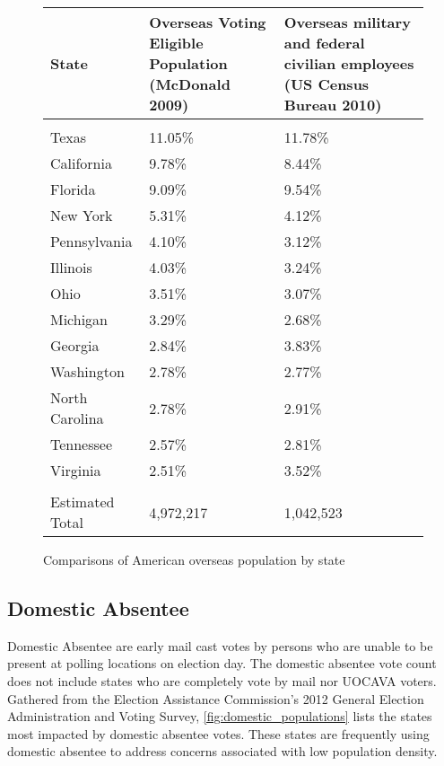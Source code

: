 \begin{figure}
\begin{center}
\begin{tabular}{l p{} p{}} %
{\bf State} & {\bf Overseas Voting Eligible \newline Population} \newline(McDonald 2009) & {\bf Overseas military and federal \newline civilian employees} \newline(US Census Bureau 2010)\\\hline\\
Texas & 11.05\% & 11.78\%\\
California & 9.78\% & 8.44\% \\
Florida & 9.09\% & 9.54\% \\
New York & 5.31\% & 4.12\% \\
Pennsylvania & 4.10\% & 3.12\% \\
Illinois & 4.03\% & 3.24\% \\
Ohio & 3.51\% & 3.07\% \\
Michigan & 3.29\% & 2.68\% \\
Georgia & 2.84\% & 3.83\% \\
Washington & 2.78\% & 2.77\% \\
North Carolina & 2.78\% & 2.91\% \\
Tennessee & 2.57\% & 2.81\% \\
Virginia & 2.51\% & 3.52\% \\\hline\\
Estimated Total & 4,972,217 & 1,042,523
\end{tabular}
\end{center}
\caption{Comparisons of American overseas population by state}
\label{fig:uocava_populations}
\end{figure}


\begin{center}
\end{center}

\subsection{Domestic Absentee}
Domestic Absentee are early mail cast votes by persons who are unable to be present at polling locations on election day. The domestic absentee vote count does not include states who are completely vote by mail nor UOCAVA voters. Gathered from the Election Assistance Commission's 2012 General Election Administration and Voting Survey, \autoref{fig:domestic_populations} lists the states most impacted by domestic absentee votes. These states are frequently using domestic absentee to address concerns associated with low population density.

